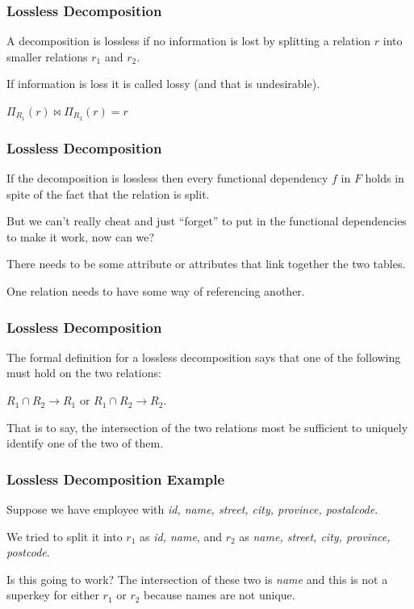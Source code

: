\begin{frame}
\frametitle{Lossless Decomposition}

A decomposition is \alert{lossless} if no information is lost by splitting a relation $r$ into smaller relations $r_{1}$ and $r_{2}$. 

If information is loss it is called \alert{lossy} (and that is undesirable).

$\Pi_{R_{1}}(r) \bowtie \Pi_{R_{2}}(r) = r$

\end{frame}



\begin{frame}
\frametitle{Lossless Decomposition}

If the decomposition is lossless then every functional dependency $f$ in $F$ holds in spite of the fact that the relation is split. 

But we can't really cheat and just ``forget'' to put in the functional dependencies to make it work, now can we?

There needs to be some attribute or attributes that link together the two tables.

One relation needs to have some way of referencing another.

\end{frame}



\begin{frame}
\frametitle{Lossless Decomposition}

The formal definition for a lossless decomposition says that one of the following must hold on the two relations: 

$R_{1} \cap R_{2} \rightarrow R_{1}$ or  $R_{1} \cap R_{2} \rightarrow R_{2}$. 

That is to say, the intersection of the two relations most be sufficient to uniquely identify one of the two of them. 

\end{frame}



\begin{frame}
\frametitle{Lossless Decomposition Example}

Suppose we have employee with \textit{id, name, street, city, province, postalcode}.

We tried to split it into $r_{1}$ as \textit{id, name}, and $r_{2}$ as \textit{name, street, city, province, postcode}. 

Is this going to work? The intersection of these two is \textit{name} and this is not a superkey for either $r_{1}$ or $r_{2}$ because names are not unique.

\end{frame}




